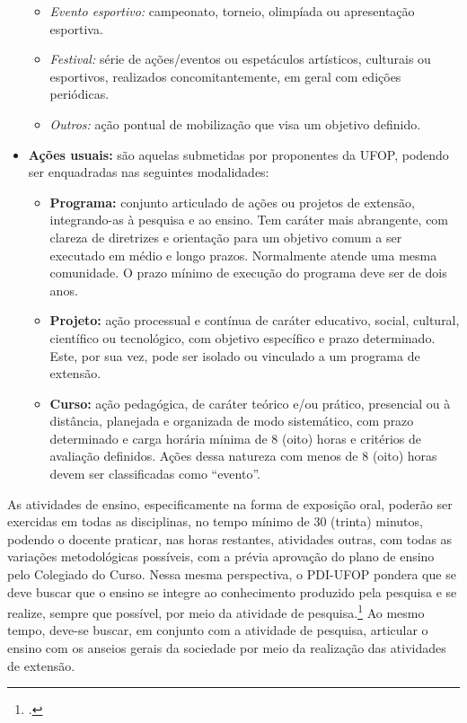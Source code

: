 \documentclass[
	12pt,				%
	openright,			%
	oneside,			%
	a4paper,			%
	english,			%
	brazil				%
	]{abntex2}
\begin{document}
\begin{itemize}
\begin{itemize}
    \item \textit{Evento esportivo:} campeonato, torneio, olimpíada ou apresentação esportiva.
    \item \textit{Festival:} série de ações/eventos ou espetáculos artísticos, culturais ou esportivos, realizados concomitantemente, em geral com edições periódicas.
    \item \textit{Outros:} ação pontual de mobilização que visa um objetivo definido.
\end{itemize}
\item \textbf{Ações usuais:} são aquelas submetidas por proponentes da UFOP, podendo ser enquadradas nas seguintes modalidades:
\begin{itemize}
    \item \textbf{Programa:} conjunto articulado de ações ou projetos de extensão, integrando-as à pesquisa e ao ensino. Tem caráter mais abrangente, com clareza de diretrizes e orientação para um objetivo comum a ser executado em médio e longo prazos. Normalmente atende uma mesma comunidade. O prazo mínimo de execução do programa deve ser de dois anos.
    \item \textbf{Projeto:} ação processual e contínua de caráter educativo, social, cultural, científico ou tecnológico, com objetivo específico e prazo determinado. Este, por sua vez, pode ser isolado ou vinculado a um programa de extensão.
    \item \textbf{Curso:} ação pedagógica, de caráter teórico e/ou prático, presencial ou à distância, planejada e organizada de modo sistemático, com prazo determinado e carga horária mínima de 8 (oito) horas e critérios de avaliação definidos. Ações dessa natureza com menos de 8 (oito) horas devem ser classificadas como ``evento''. %
\end{itemize}
\end{itemize}


As atividades de ensino, especificamente na forma de exposição oral, poderão ser exercidas em todas as disciplinas, no tempo mínimo de 30 (trinta) minutos, podendo o docente praticar, nas horas restantes, atividades outras, com todas as variações metodológicas possíveis, com a prévia aprovação do plano de ensino pelo Colegiado do Curso. Nessa mesma perspectiva, o PDI-UFOP pondera que se deve buscar que o ensino se integre ao conhecimento produzido pela pesquisa e se realize, sempre que possível, por meio da atividade de pesquisa.\footcite[p.~34]{PDI-UFOP} Ao mesmo tempo, deve-se buscar, em conjunto com a atividade de pesquisa, articular o ensino com os anseios gerais da sociedade por meio da realização das atividades de extensão.
\end{document}
